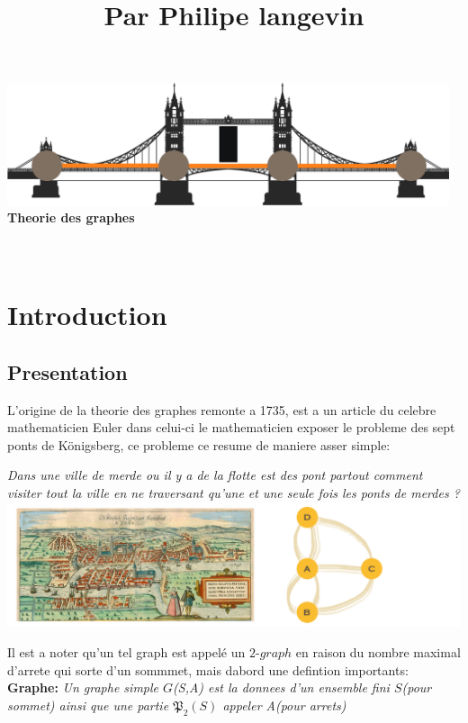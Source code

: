 \documentclass[a4paper,11pt]{article}
\title{\color{OrangeHaf} Par Philipe langevin}
\date{}
\begin{document}
\pagecolor{BlackHaf}
     \begin{center}
     \hfill\includegraphics[width=13cm]{logoI51.png}\hspace*{\fill}
     \\
     \textbf{\color{OrangeHaf}\huge Theorie des graphes}\\
     \\
     \\
     \end{center}
     \tableofcontents
     \section{\color{OrangeHaf}Introduction}
        \subsection{Presentation}
        L'origine de la theorie des graphes remonte a 1735, est a un article du celebre
        mathematicien Euler dans celui-ci le mathematicien exposer le probleme des sept ponts de Königsberg, ce probleme ce resume de maniere asser simple:
        \\
        \begin{center}
        \emph{ Dans une ville de merde ou il y a de la flotte est des pont partout comment visiter tout la ville en ne traversant qu'une et une seule fois les ponts de merdes ?}
        \\
     \hfill\includegraphics[width=14cm]{graphPnt.png}\hspace*{\fill}
        \end{center}
        Il est a noter qu'un tel graph est appelé un $2$-$graph$ en raison du nombre maximal d'arrete qui sorte d'un sommmet, mais dabord une defintion importants:
        \\
        \textbf{Graphe:}
          \emph{Un graphe simple $G$(S,A) est la donnees d'un ensemble fini $S$(pour sommet) ainsi que une partie $\mathfrak{P}_2(S)$ appeler A(pour arrets)}
\end{document}
